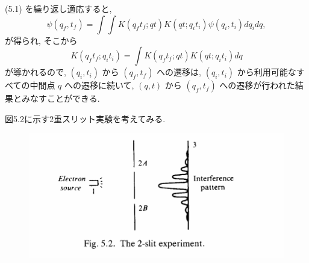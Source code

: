 \documentclass[a4paper,12pt]{article}
\begin{document}
(5.1) を繰り返し適応すると,
\begin{equation*}
    \psi(q_f, t_f) = \int\int K(q_{f}t_{f}; qt)K(qt; q_{i}t_{i})\psi(q_i, t_i)dq_{i}dq,
\end{equation*}
が得られ, そこから
\begin{equation*}
    K(q_{f}t_{f}; q_{i}t_{i}) = \int K(q_{f}t_{f}; qt)K(qt; q_{i}t_{i}) dq \tag{5.2}
\end{equation*}
が導かれるので, $(q_i, t_i)$ から $(q_f, t_f)$ への遷移は, $(q_i, t_i)$ から利用可能なすべての中間点 $q$ への遷移に続いて, $(q, t)$ から $(q_f, t_f)$ への遷移が行われた結果とみなすことができる.\par
図5.2に示す2重スリット実験を考えてみる. 

\begin{figure}[H]
    \centering
    \includegraphics[width=13cm]{figure/fig5-2.png}
\end{figure}
\end{document}
